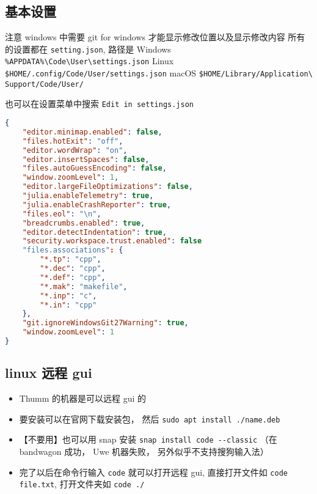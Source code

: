 
\subsection{基本设置}

注意 windows 中需要 git for windows 才能显示修改位置以及显示修改内容
所有的设置都在 \verb`setting.json`, 路径是
Windows \verb`%APPDATA%\Code\User\settings.json`
Linux \verb`$HOME/.config/Code/User/settings.json`
macOS \verb`$HOME/Library/Application\ Support/Code/User/`

也可以在设置菜单中搜索 \verb`Edit in settings.json`

\begin{lstlisting}[language=json,caption=settings.json]
{
	"editor.minimap.enabled": false,
	"files.hotExit": "off",
	"editor.wordWrap": "on",
    "editor.insertSpaces": false,
	"files.autoGuessEncoding": false,
	"window.zoomLevel": 1,
	"editor.largeFileOptimizations": false,
	"julia.enableTelemetry": true,
	"julia.enableCrashReporter": true,
	"files.eol": "\n",
	"breadcrumbs.enabled": true,
	"editor.detectIndentation": true,
	"security.workspace.trust.enabled": false
	"files.associations": {
		"*.tp": "cpp",
		"*.dec": "cpp",
		"*.def": "cpp",
		"*.mak": "makefile",
		"*.inp": "c",
		"*.in": "cpp"
	},
	"git.ignoreWindowsGit27Warning": true,
	"window.zoomLevel": 1
}
\end{lstlisting}


\subsection{linux 远程 gui}
\begin{itemize}
\item Thumm 的机器是可以远程 gui 的
\item 要安装可以在官网下载安装包， 然后 \verb`sudo apt install ./name.deb`
\item 【不要用】也可以用 snap 安装 \verb`snap install code --classic` （在 bandwagon 成功， Uwe 机器失败， 另外似乎不支持搜狗输入法）
\item 完了以后在命令行输入 \verb`code` 就可以打开远程 gui, 直接打开文件如 \verb`code file.txt`, 打开文件夹如 \verb`code ./`
\end{itemize}
